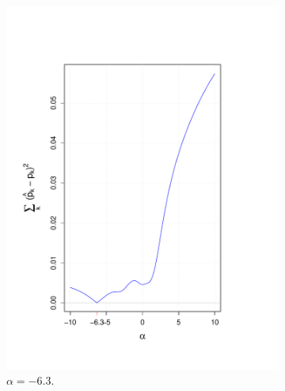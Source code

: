 \documentclass[10pt]{article}
\begin{document}

\begin{figure}[H]
\centering
\begin{subfigure}{.25\textwidth}
  \centering
  \includegraphics[width=\linewidth]{alpha_trace_-6_3.pdf}
  \caption{ $\alpha = -6.3$.}
  \label{fig: alpha_negative}
\end{subfigure}%
\begin{subfigure}{.25\textwidth}
  \centering

\end{subfigure}
\end{figure}
\end{document}
